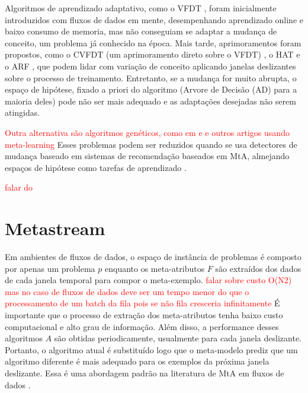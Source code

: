 Algoritmos de aprendizado adaptativo, como o VFDT \cite{domingos2000mining},
foram inicialmente introduzidos com fluxos de dados em mente, desempenhando aprendizado online e baixo consumo de memoria, mas não conseguiam se adaptar a mudança de conceito, um problema já conhecido na época.
Mais tarde, aprimoramentos foram propostos, como o CVFDT (um aprimoramento direto sobre o VFDT) \cite{hulten2001mining}, o HAT \cite{bifet2009adaptive} e o ARF \cite{gomes2017adaptive}, que podem lidar com variação de conceito aplicando janelas deslizantes sobre o processo de treinamento.
Entretanto, se a mudança for muito abrupta, o espaço de hipótese, fixado a priori do algoritmo (Arvore de Decisão (AD) para a maioria deles) pode não ser mais adequado e as adaptações desejadas não serem atingidas.

\textcolor{red}{Outra alternativa são algoritmos genéticos, como em \cite{kanade2010evolution} e \cite{kang2017visualising} e outros artigos usando meta-learning}
Esses problemas podem ser reduzidos quando se usa detectores de mudança baseado em sistemas de recomendação baseados em MtA, almejando espaços de hipótese como tarefas de aprendizado \cite{rossi2014metastream}.

\textcolor{red}{falar do \cite{talagala2018meta}}

\section{Metastream}
\label{sec:metastream}


Em ambientes de fluxos de dados, o espaço de instância de problemas é composto por apenas um problema $p$ enquanto os meta-atributos $F$ são extraídos dos dados de cada janela temporal para compor o meta-exemplo.
\textcolor{red}{falar sobre custo O(N2) mas no caso de fluxos de dados deve ser um tempo menor do que o processamento de um batch da fila pois se não fila cresceria infinitamente}
É importante que o processo de extração dos meta-atributos tenha baixo custo computacional e alto grau de informação.
Além disso, a  performance desses algoritmos $A$ são obtidas periodicamente, usualmente para cada janela deslizante. 
Portanto, o algoritmo atual é substituído logo que o meta-modelo prediz que um algoritmo diferente é mais adequado para os exemplos da próxima janela deslizante.
Essa é uma abordagem padrão na literatura de MtA em fluxos de dados \cite{read2012batch, vanrijn2014algorithm, Anderson2019}.


